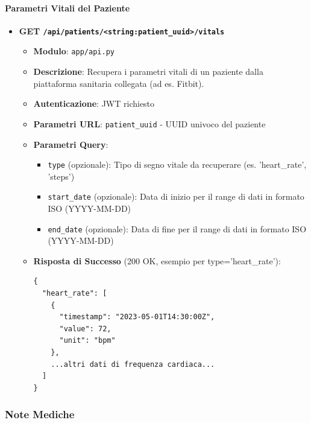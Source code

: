 \documentclass[12pt,a4paper,oneside]{report}
\begin{document}
\paragraph{Parametri Vitali del Paziente}
\begin{itemize}
    \item \textbf{GET \texttt{/api/patients/<string:patient\_uuid>/vitals}}
          \begin{itemize}
              \item \textbf{Modulo}: \texttt{app/api.py}
              \item \textbf{Descrizione}: Recupera i parametri vitali di un paziente dalla piattaforma sanitaria collegata (ad es. Fitbit).
              \item \textbf{Autenticazione}: JWT richiesto
              \item \textbf{Parametri URL}: \texttt{patient\_uuid} - UUID univoco del paziente
              \item \textbf{Parametri Query}:
                    \begin{itemize}
                        \item \texttt{type} (opzionale): Tipo di segno vitale da recuperare (es. 'heart\_rate', 'steps')
                        \item \texttt{start\_date} (opzionale): Data di inizio per il range di dati in formato ISO (YYYY-MM-DD)
                        \item \texttt{end\_date} (opzionale): Data di fine per il range di dati in formato ISO (YYYY-MM-DD)
                    \end{itemize}
              \item \textbf{Risposta di Successo} (200 OK, esempio per type='heart\_rate'):
                    \begin{verbatim}
{
  "heart_rate": [
    {
      "timestamp": "2023-05-01T14:30:00Z",
      "value": 72,
      "unit": "bpm"
    },
    ...altri dati di frequenza cardiaca...
  ]
}
        \end{verbatim}
          \end{itemize}
\end{itemize}

\subsubsection{Note Mediche}
\end{document}
